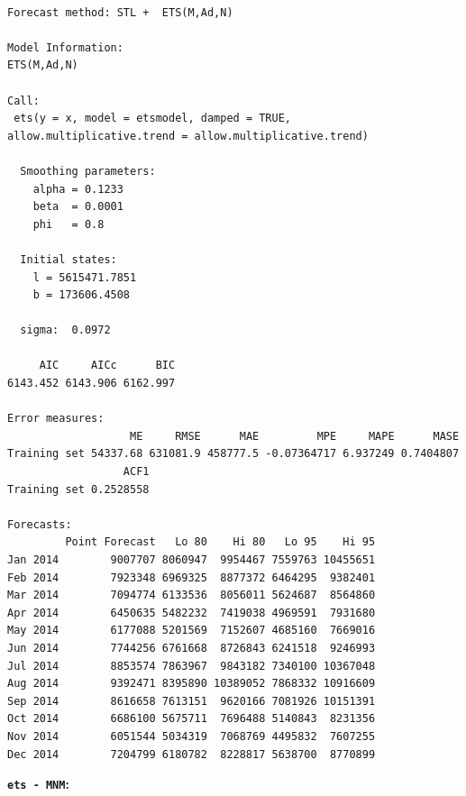 \documentclass[openany]{book}
\begin{document}
\begin{verbatim}

Forecast method: STL +  ETS(M,Ad,N)

Model Information:
ETS(M,Ad,N) 

Call:
 ets(y = x, model = etsmodel, damped = TRUE, allow.multiplicative.trend = allow.multiplicative.trend) 

  Smoothing parameters:
    alpha = 0.1233 
    beta  = 0.0001 
    phi   = 0.8 

  Initial states:
    l = 5615471.7851 
    b = 173606.4508 

  sigma:  0.0972

     AIC     AICc      BIC 
6143.452 6143.906 6162.997 

Error measures:
                   ME     RMSE      MAE         MPE     MAPE      MASE
Training set 54337.68 631081.9 458777.5 -0.07364717 6.937249 0.7404807
                  ACF1
Training set 0.2528558

Forecasts:
         Point Forecast   Lo 80    Hi 80   Lo 95    Hi 95
Jan 2014        9007707 8060947  9954467 7559763 10455651
Feb 2014        7923348 6969325  8877372 6464295  9382401
Mar 2014        7094774 6133536  8056011 5624687  8564860
Apr 2014        6450635 5482232  7419038 4969591  7931680
May 2014        6177088 5201569  7152607 4685160  7669016
Jun 2014        7744256 6761668  8726843 6241518  9246993
Jul 2014        8853574 7863967  9843182 7340100 10367048
Aug 2014        9392471 8395890 10389052 7868332 10916609
Sep 2014        8616658 7613151  9620166 7081926 10151391
Oct 2014        6686100 5675711  7696488 5140843  8231356
Nov 2014        6051544 5034319  7068769 4495832  7607255
Dec 2014        7204799 6180782  8228817 5638700  8770899
\end{verbatim}

\textbf{\texttt{ets\ -\ MNM}:}
\end{document}
